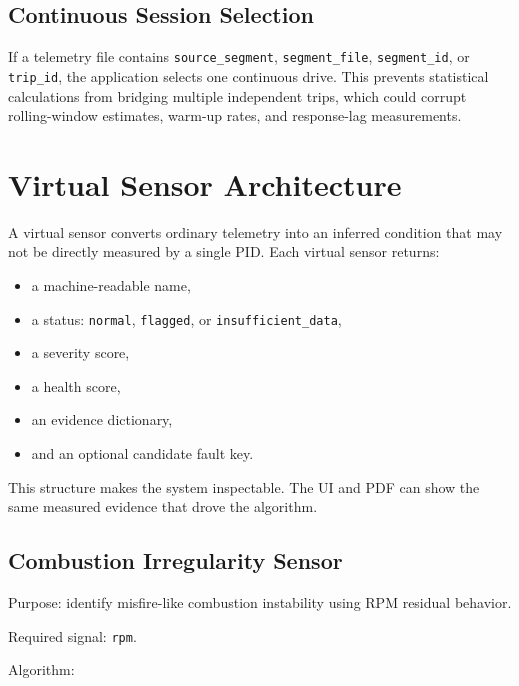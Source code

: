 \documentclass[11pt,a4paper]{article}
\begin{document}
\subsection{Continuous Session Selection}

If a telemetry file contains \texttt{source\_segment}, \texttt{segment\_file}, \texttt{segment\_id}, or \texttt{trip\_id}, the application selects one continuous drive. This prevents statistical calculations from bridging multiple independent trips, which could corrupt rolling-window estimates, warm-up rates, and response-lag measurements.

\section{Virtual Sensor Architecture}

A virtual sensor converts ordinary telemetry into an inferred condition that may not be directly measured by a single PID. Each virtual sensor returns:

\begin{itemize}
\item a machine-readable name,
\item a status: \texttt{normal}, \texttt{flagged}, or \texttt{insufficient\_data},
\item a severity score,
\item a health score,
\item an evidence dictionary,
\item and an optional candidate fault key.
\end{itemize}

This structure makes the system inspectable. The UI and PDF can show the same measured evidence that drove the algorithm.

\subsection{Combustion Irregularity Sensor}

Purpose: identify misfire-like combustion instability using RPM residual behavior.

Required signal: \texttt{rpm}.

Algorithm:
\end{document}
